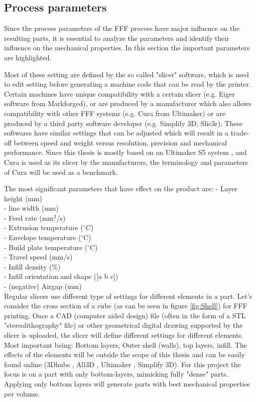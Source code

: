 \subsection{Process parameters}
    \label{Process parameters}
Since the process parameters of the FFF process have major influence on the resulting parts, it is essential to analyze the parameters and identify their influence on the mechanical properties. In this section the important parameters are highlighted.

Most of these setting are defined by the so called "slicer" software, which is used to edit setting before generating a machine code that can be read by the printer. Certain machines have unique compatibility with a certain slicer (e.g. Eiger software from Markforged), or are produced by a manufacturer which also allows compatibility with other FFF systems (e.g. Cura from Ultimaker) or are produced  by a third party software developer (e.g. Simplify 3D, Slic3r). These softwares have similar settings that can be adjusted which will result in a  trade-off between speed and weight versus resolution, precision and mechanical performance. Since this thesis is mostly based on an Ultimaker S5 system \cite{UltimakerUltimakerS5}, and Cura is used as its slicer by the manufacturers, the terminology and parameters of Cura will be used as a benchmark. 

The most significant parameters that have effect on the product are:
- Layer height (mm)\\
- line width (mm)\\
- Feed rate (mm$^3$/s)\\
- Extrusion temperature ($^{\circ}$C)\\
- Envelope temperature ($^{\circ}$C)\\
- Build plate temperature ($^{\circ}$C)\\
- Travel speed (mm/s)\\
- Infill density (\%)\\
- Infill orientation and shape ([a b c])\\
- (negative) Airgap (mm)\\


Regular slicers use different type of settings for  different elements in a part. Let's consider the cross section of a cube (as can be seen in figure \ref{fig:Shell}) for FFF printing. Once a CAD (computer aided design) file (often in the form of a STL "stereolithography" file) or other geometrical digital drawing supported by the slicer is uploaded, the slicer will define different settings for different elements. Most important being: Bottom layers, Outer shell (walls), top layers, infill. The effects of the  elements will be outside the scope of this thesis and can be easily found online (3Dhubs \cite{3DHubsIntroductionPrinting}, All3D \cite{all3dpAll3dp}, Ultimaker \cite{UltimakerUltimakerSheet}, Simplify 3D\cite{Simplefy3DPrintGuide}). For this project the focus is on a part with only bottom-layers, mimicking fully "dense" parts. Applying only bottom layers will generate parts with best mechanical properties per volume.   \cite{Li2017TheProperties}

